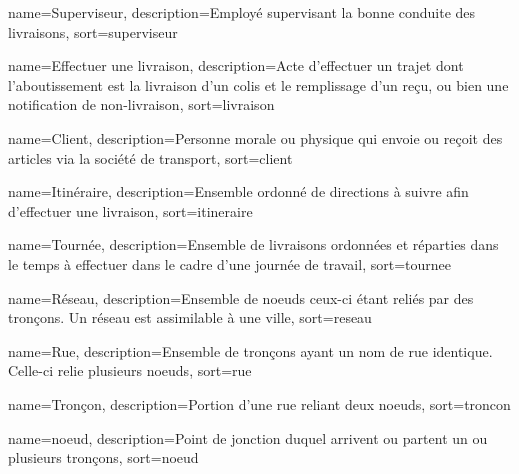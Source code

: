 {
	name={Superviseur},
	description={Employé supervisant la bonne conduite des livraisons},
	sort={superviseur}
}

{
	name={Effectuer une livraison},
	description={Acte d'effectuer un trajet dont l'aboutissement est la livraison d'un colis et le remplissage d'un reçu, ou bien une notification de non-livraison},
	sort={livraison}
}

{
	name={Client},
	description={Personne morale ou physique qui envoie ou reçoit des articles via la société de transport},
	sort={client}
}

{
	name={Itinéraire},
	description={Ensemble ordonné de directions à suivre afin d'effectuer une livraison},
	sort={itineraire}
}

{
	name={Tournée},
	description={Ensemble de livraisons ordonnées et réparties dans le temps à effectuer dans le cadre d'une journée de travail},
	sort={tournee}
}

{
	name={Réseau},
	description={Ensemble de noeuds ceux-ci étant reliés par des tronçons. Un réseau est assimilable à une ville},
	sort={reseau}
}

{
	name={Rue},
	description={Ensemble de tronçons ayant un nom de rue identique. Celle-ci relie plusieurs noeuds},
	sort={rue}
}

{
	name={Tronçon},
	description={Portion d'une rue reliant deux noeuds},
	sort={troncon}
}

{
	name={noeud},
	description={Point de jonction duquel arrivent ou partent un ou plusieurs tronçons},
	sort={noeud}
}
